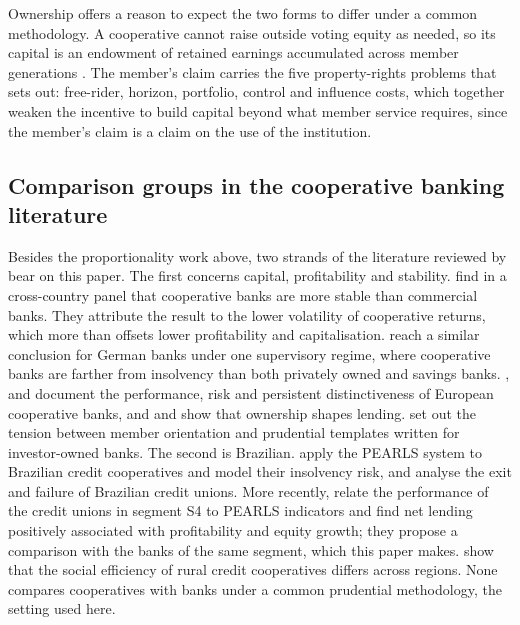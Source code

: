 \documentclass[11pt,a4paper]{article}
\begin{document}
Ownership offers a reason to expect the two forms to differ under a common methodology. A
cooperative cannot raise outside voting equity as needed, so its capital is an endowment
of retained earnings accumulated across member generations \citep{fonteyne2007}. The
member's claim carries
the five property-rights problems that \citet{cook1995} sets out: free-rider, horizon,
portfolio, control and influence costs, which together weaken the incentive to build
capital beyond what member service requires, since the member's claim is a claim on the
use of the institution.

\subsection{Comparison groups in the cooperative banking literature}

Besides the proportionality work above, two strands of the literature reviewed by
\citet{mckillop2020} bear on this paper. The first concerns capital, profitability and
stability. \citet{hesse2007} find in a cross-country panel that cooperative banks are
more stable than commercial banks. They attribute the result to the lower volatility of
cooperative returns, which more than offsets lower profitability and capitalisation.
\citet{beck2009} reach a similar conclusion for German banks under one supervisory
regime, where cooperative banks are farther from insolvency than both privately owned
and savings banks. \citet{ayadi2010}, \citet{iannotta2007} and \citet{groeneveld2020} document the
performance, risk and persistent distinctiveness of European cooperative banks, and
\citet{becchetti2016} and \citet{ferri2014} show that ownership shapes lending.
\citet{cuevas2006} set out the tension
between member orientation and prudential templates written for investor-owned banks. The
second is Brazilian. \citet{bressan2011} apply the PEARLS system to Brazilian credit
cooperatives and model their insolvency risk, and \citet{carvalho2015} analyse the exit
and failure of Brazilian credit unions. More recently, \citet{silva2023} relate the
performance of the credit unions in segment S4 to PEARLS indicators and find net lending
positively associated with profitability and equity growth; they propose a comparison
with the banks of the same segment, which this paper makes. \citet{cavinato2023} show
that the social efficiency of rural credit cooperatives differs across regions.
None compares cooperatives with banks under a common prudential methodology, the
setting used here.
\end{document}
